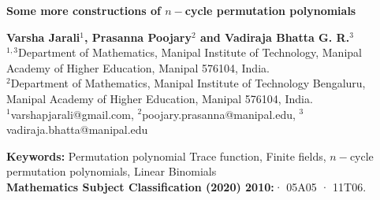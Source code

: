 \documentclass[12pt,a4paper]{article}
\begin{document}
	\begin{center}
		\textbf{\Large Some more constructions of $ n-$cycle permutation polynomials}
	\end{center}
	\begin{center}
		\textbf{Varsha Jarali$^1$, Prasanna Poojary$^2$ and Vadiraja Bhatta G. R.$^3$}\\[3pt]
		$^{1,3}$Department of Mathematics, Manipal Institute of Technology, Manipal Academy of Higher
		Education, Manipal 576104, India.\\[3pt]
		$^2$Department of Mathematics, Manipal Institute of Technology Bengaluru, Manipal Academy of
		Higher Education, Manipal 576104, India.\\[3pt]
		$^1$varshapjarali@gmail.com, $^2$poojary.prasanna@manipal.edu, $^3$vadiraja.bhatta@manipal.edu
	\end{center}
	\begin{abstract}
		$ n-$cycle permutation polynomials with small n have the advantage that their compositional inverses are efficient
in terms of implementation. These permutation polynomials have significant applications in cryptography and coding theory. In this article, we propose criteria for the construction of $ n-$cycle permutation using linearized polynomial $ L(x) $ for larger $ n $. Furthermore, we investigate and generalize certain novel forms of $ n-$cycle permutation polynomials. Finally, we demonstrate our approach by constructing explicit $ n-$cycle permutation of the form $ L(x)+\gamma h(Tr_{q^{m}/q}(x)) $, and $ G(x)+\gamma f(x) $ with a Boolean function $ f(x) $. The polynomial $ x^{d}+\gamma f(x) $ with $ f(x) $ being a Boolean function is shown to be quadruple and quintuple permutation polynomials. Moreover, linear binomial triple-cycle permutation polynomials are constructed.
	\end{abstract}
	\textbf{Keywords:} Permutation polynomial Trace function, Finite fields, $ n-$cycle permutation polynomials, Linear Binomials\\
    \textbf{Mathematics Subject Classification (2020) 2010:}· 05A05 · 11T06.
\end{document}
